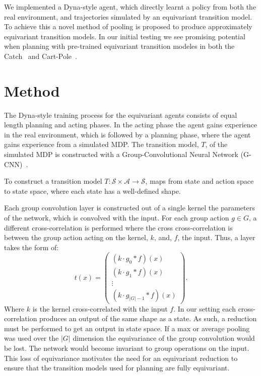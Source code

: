 \documentclass[mlabstract]{jmlr}
\begin{document}
We implemented a Dyna-style agent, which directly learnt a policy from both the real environment, and trajectories simulated by an equivariant transition model. To achieve this a novel method of pooling is proposed to produce approximately equivariant transition models. In our initial testing we see promising potential when planning with pre-trained equivariant transition modeles in both the Catch~\cite{osband2020bsuite} and Cart-Pole~\cite{barto1983neuronlike, florian2007correct}.
\section{Method}
The Dyna-style training process for the equivariant agents consists of equal length planning and acting phases. In the acting phase the agent gains experience in the real environment, which is followed by a planning phase, where the agent gains experience from a simulated MDP. The transition model, $T$, of the simulated MDP is constructed with a Group-Convolutional Neural Network (G-CNN)~\cite{cohen2016group}.

To construct a transition model $T: \mathcal{S} \times \mathcal{A} \rightarrow \mathcal{S}$, maps from state and action space to state space, where each state has a well-defined shape.

Each group convolution layer is constructed out of a single kernel the parameters of the network, which is convolved with the input. For each group action $g \in G$, a different cross-correlation is performed where the cross cross-correlation is between the group action acting on the kernel, $k$, and, $f$, the input. Thus, a layer takes the form of:
\begin{equation}
	t(x) = \begin{pmatrix}
		(k \cdot g_0* f )(x)  \\
		(k \cdot g_1 * f )(x) \\
		\vdots                \\
		(k \cdot g_{|G|-1} * f)(x)
	\end{pmatrix}.
	\label{eq:g-cnn}
\end{equation}
Where $k$ is the kernel cross-correlated with the input $f$. In our setting each cross-correlation produces an output of the same shape as a state. As such, a reduction must be performed to get an output in state space. If a max or average pooling was used over the $|G|$ dimension the equivariance of the group convolution would be lost. The network would become invariant to group operations on the input. This loss of equivariance motivates the need for an equivariant reduction to ensure that the transition models used for planning are fully equivariant.
\end{document}
